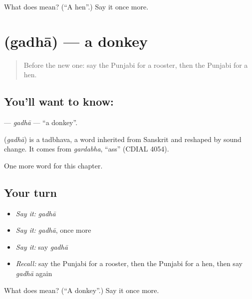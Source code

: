 \begin{tcolorbox}[breakable,colback=teal!4,colframe=teal!35!black,title={Before you move on}]
What does  mean? (\textquotedblleft{}A hen\textquotedblright{}.) Say it once more.
\end{tcolorbox}
\section[\texorpdfstring{\pa{ਗਧਾ} (gadhā)}{ਗਧਾ (gadhā)}]{ (gadhā) — a donkey}

\label{lesson:PA-C133-gadha}



\begin{quote}
Before the new one: say the Punjabi for a rooster, then the Punjabi for a hen.
\end{quote}

\subsection*{You'll want to know: }
\textbf{} — \emph{gadhā} — \textquotedblleft{}a donkey\textquotedblright{}.

\begin{cousinweb}
\textbf{} (\emph{gadhā}) is a tadbhava, a word inherited from Sanskrit and reshaped by sound change. It comes from \emph{gardabha}, \textquotedblleft{}ass\textquotedblright{} (CDIAL 4054).
\end{cousinweb}

\begin{grammarlens}[title={What you've built}]
One more word for this chapter.
\end{grammarlens}

\subsection*{Your turn}
\begin{itemize}
\raggedright
  \item \emph{Say it:} \emph{gadhā}
  \item \emph{Say it:} \emph{gadhā}, once more
  \item \emph{Say it:} say \emph{gadhā}
  \item \emph{Recall:} say the Punjabi for a rooster, then the Punjabi for a hen, then say \emph{gadhā} again
\end{itemize}

\begin{tcolorbox}[breakable,colback=teal!4,colframe=teal!35!black,title={Before you move on}]
What does  mean? (\textquotedblleft{}A donkey\textquotedblright{}.) Say it once more.
\end{tcolorbox}
